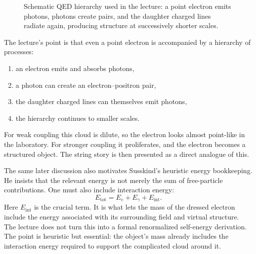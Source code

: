 \begin{figure}[htbp]
\centering
{}
\caption{Schematic QED hierarchy used in the lecture: a point electron emits photons, photons create pairs, and the daughter charged lines radiate again, producing structure at successively shorter scales.}
\end{figure}

The lecture's point is that even a point electron is accompanied by a hierarchy of processes:
\begin{enumerate}
\item an electron emits and absorbs photons,
\item a photon can create an electron--positron pair,
\item the daughter charged lines can themselves emit photons,
\item the hierarchy continues to smaller scales.
\end{enumerate}
For weak coupling this cloud is dilute, so the electron looks almost point-like in the laboratory. For stronger coupling it proliferates, and the electron becomes a structured object. The string story is then presented as a direct analogue of this.

The same later discussion also motivates Susskind's heuristic energy bookkeeping. He insists that the relevant energy is not merely the sum of free-particle contributions. One must also include interaction energy:
\begin{equation}
E_{\mathrm{tot}} = E_e + E_\gamma + E_{\mathrm{int}}.
\end{equation}
Here \(E_{\mathrm{int}}\) is the crucial term. It is what lets the mass of the dressed electron include the energy associated with its surrounding field and virtual structure. The lecture does not turn this into a formal renormalized self-energy derivation. The point is heuristic but essential: the object's mass already includes the interaction energy required to support the complicated cloud around it.

